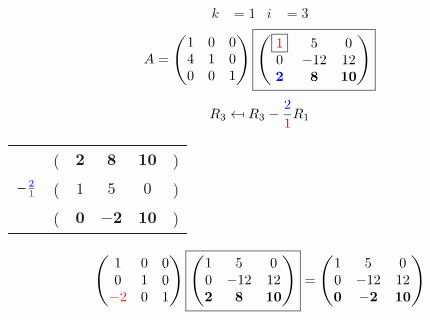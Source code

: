 \documentclass[pdf]{beamer}
\begin{document}
\begin{frame}{}\begin{align*} k &= 1 & i &= 3 \end{align*} $$A=\begin{pmatrix}1&0&0\\4&1&0\\0&0&1\end{pmatrix} \boxed{\begin{pmatrix}\boxed{{\color{red}1}}&5&0\\0&-12&12\\\mathbf{{\color{blue}2}}&\mathbf{8}&\mathbf{10}\end{pmatrix}} $$ $$R_3 \mapsfrom R_3 - \frac{{\color{blue}2}}{{\color{red}1}} R_1$$ \begin{center}\begin{tabular}{cccccc}  &(& $ \mathbf{2} $ & $ \mathbf{8} $ & $ \mathbf{10} $ &)\\$ -\frac{{\color{blue}2}}{{\color{red}1}} $&(& $ 1 $ & $ 5 $ & $ 0 $ &)\\\hline  &(& $ \mathbf{0} $ & $ \mathbf{-2} $ & $ \mathbf{10} $ &) \end{tabular}\end{center} $$ \begin{pmatrix}1&0&0\\0&1&0\\{\color{red}-2}&0&1\end{pmatrix} \boxed{\begin{pmatrix}1&5&0\\0&-12&12\\\mathbf{2}&\mathbf{8}&\mathbf{10}\end{pmatrix}} = \begin{pmatrix}1&5&0\\0&-12&12\\\mathbf{0}&\mathbf{-2}&\mathbf{10}\end{pmatrix} $$\end{frame}
\end{document}

